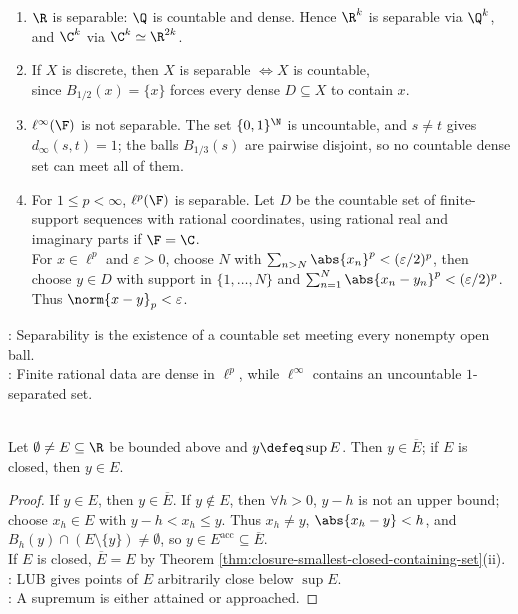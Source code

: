 \begin{example} \label{ex:separable-and-nonseparable-metric-spaces} 
\begin{enumerate}[label=(\roman*)]
\setlength{\itemsep}{0pt}
\item $\R$ is separable: $\Q$ is countable and dense. Hence $\R^k$ is separable via $\Q^k$, and $\C^k$ via $\C^k\simeq\R^{2k}$.
\item If $X$ is discrete, then $X$ is separable $\Longleftrightarrow X$ is countable,\\
since $B_{1/2}(x)=\{x\}$ forces every dense $D\subseteq X$ to contain $x$.
\item $\ell^\infty(\F)$ is not separable. The set $\{0,1\}^{\N}$ is uncountable, and $s\ne t$ gives $d_\infty(s,t)=1$; the balls $B_{1/3}(s)$ are pairwise disjoint, so no countable dense set can meet all of them.
\item For $1\leq p<\infty$, $\ell^p(\F)$ is separable. Let $D$ be the countable set of finite-support sequences with rational coordinates, using rational real and imaginary parts if $\F=\C$.\\
For $x\in\ell^p$ and $\varepsilon>0$, choose $N$ with $\sum_{n>N}\abs{x_n}^p<(\varepsilon/2)^p$, then choose $y\in D$ with support in $\{1,\ldots,N\}$ and $\sum_{n=1}^N\abs{x_n-y_n}^p<(\varepsilon/2)^p$. Thus $\norm{x-y}_p<\varepsilon$.
\end{enumerate}
: Separability is the existence of a countable set meeting every nonempty open ball.\\
: Finite rational data are dense in $\ell^p$, while $\ell^\infty$ contains an uncountable $1$-separated set.
\end{example}

\begin{theorem} \label{thm:supremum-belongs-to-closure} \\
Let $\emptyset\ne E\subseteq\R$ be bounded above and $y\defeq\sup E$. Then $y\in\overline{E}$; if $E$ is closed, then $y\in E$.
\begin{proof}
If $y\in E$, then $y\in\overline{E}$. If $y\notin E$, then $\forall h>0$, $y-h$ is not an upper bound; choose $x_h\in E$ with $y-h<x_h\leq y$. Thus $x_h\ne y$, $\abs{x_h-y}<h$, and $B_h(y)\cap(E\setminus\{y\})\ne\emptyset$, so $y\in E^{\operatorname{acc}}\subseteq\overline{E}$.\\
If $E$ is closed, $\overline{E}=E$ by Theorem \ref{thm:closure-smallest-closed-containing-set}(ii).\\
: LUB gives points of $E$ arbitrarily close below $\sup E$.\\
: A supremum is either attained or approached.
\end{proof}
\end{theorem}

